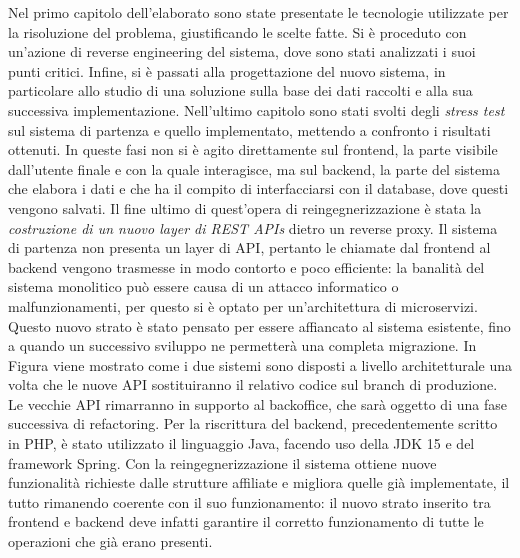 \documentclass[a4paper,11pt]{article}
\begin{document}
	   Nel primo capitolo dell'elaborato sono state presentate le tecnologie utilizzate per la risoluzione del problema, giustificando le scelte fatte.  Si è proceduto con un'azione di reverse engineering del sistema, dove sono stati analizzati i suoi punti critici. Infine, si è passati alla progettazione del nuovo sistema, in particolare allo studio di una soluzione sulla base dei dati raccolti e alla sua successiva implementazione. Nell'ultimo capitolo sono stati svolti degli \emph{stress test} sul sistema di partenza e quello implementato, mettendo a confronto i risultati ottenuti. In queste fasi non si è agito direttamente sul frontend, la parte visibile dall’utente finale e con la quale interagisce, ma sul backend, la parte del sistema che elabora i dati e che ha il compito di interfacciarsi con il database, dove questi vengono salvati. Il fine ultimo di quest’opera di reingegnerizzazione è stata la \emph{costruzione di un nuovo layer di REST APIs} dietro un reverse proxy. Il sistema di partenza non presenta un layer di API, pertanto le chiamate dal frontend al backend vengono trasmesse in modo contorto e poco efficiente: la banalità del sistema monolitico può essere causa di un attacco informatico o malfunzionamenti, per questo si è optato per un’architettura di microservizi. Questo nuovo strato è stato pensato per essere affiancato al sistema esistente, fino a quando un successivo sviluppo ne permetterà una completa migrazione. In Figura viene mostrato come i due sistemi sono disposti a livello architetturale una volta che le nuove API sostituiranno il relativo codice sul branch di produzione. Le vecchie API rimarranno in supporto al backoffice, che sarà oggetto di una fase successiva di refactoring. Per la riscrittura del backend, precedentemente scritto in PHP, è stato utilizzato il linguaggio Java, facendo uso della JDK 15 e del framework Spring. Con la reingegnerizzazione il sistema ottiene nuove funzionalità richieste dalle strutture affiliate e migliora quelle già implementate, il tutto rimanendo coerente con il suo funzionamento: il nuovo strato inserito tra frontend e backend deve infatti garantire il corretto funzionamento di tutte le operazioni che già erano presenti. 
\end{document}

